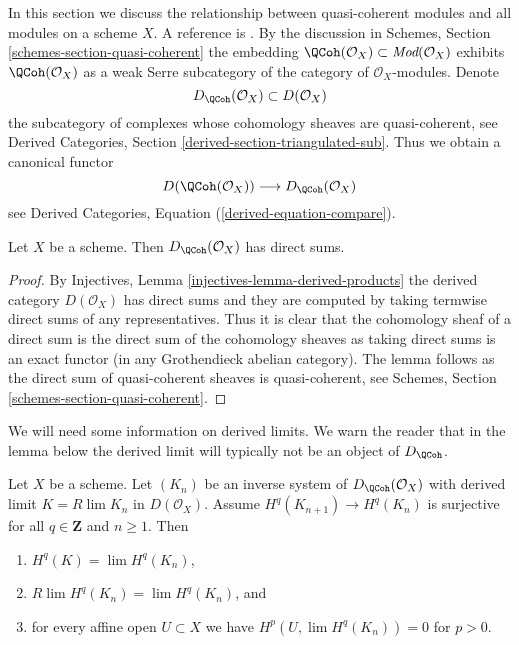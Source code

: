 \noindent
In this section we discuss the relationship between quasi-coherent
modules and all modules on a scheme $X$. A reference is
\cite[Appendix B]{TT}. By the discussion in
Schemes, Section \ref{schemes-section-quasi-coherent}
the embedding
$\QCoh(\mathcal{O}_X) \subset \textit{Mod}(\mathcal{O}_X)$
exhibits $\QCoh(\mathcal{O}_X)$ as a weak Serre subcategory of
the category of $\mathcal{O}_X$-modules. Denote
$$
D_\QCoh(\mathcal{O}_X) \subset D(\mathcal{O}_X)
$$
the subcategory of complexes whose cohomology sheaves are quasi-coherent, see
Derived Categories, Section \ref{derived-section-triangulated-sub}.
Thus we obtain a canonical functor
\begin{equation}
\label{equation-compare}
D(\QCoh(\mathcal{O}_X))
\longrightarrow
D_\QCoh(\mathcal{O}_X)
\end{equation}
see Derived Categories, Equation (\ref{derived-equation-compare}).

\begin{lemma}
\label{lemma-quasi-coherence-direct-sums}
Let $X$ be a scheme. Then $D_\QCoh(\mathcal{O}_X)$
has direct sums.
\end{lemma}

\begin{proof}
By Injectives, Lemma \ref{injectives-lemma-derived-products}
the derived category $D(\mathcal{O}_X)$ has direct sums and
they are computed by taking termwise direct sums of any representatives.
Thus it is clear that the cohomology sheaf of a direct sum is the
direct sum of the cohomology sheaves as taking direct sums is
an exact functor (in any Grothendieck abelian category). The lemma
follows as the direct sum of quasi-coherent sheaves is quasi-coherent, see
Schemes, Section \ref{schemes-section-quasi-coherent}.
\end{proof}

\noindent
We will need some information on derived limits. We warn the reader
that in the lemma below the derived limit will typically not be
an object of $D_\QCoh$.

\begin{lemma}
\label{lemma-Rlim-quasi-coherent}
Let $X$ be a scheme. Let $(K_n)$ be an inverse system of
$D_\QCoh(\mathcal{O}_X)$ with derived limit
$K = R\lim K_n$ in $D(\mathcal{O}_X)$. Assume $H^q(K_{n + 1}) \to H^q(K_n)$
is surjective for all $q \in \mathbf{Z}$ and $n \geq 1$.
Then
\begin{enumerate}
\item $H^q(K) = \lim H^q(K_n)$,
\item $R\lim H^q(K_n) = \lim H^q(K_n)$, and
\item for every affine open $U \subset X$ we have
$H^p(U, \lim H^q(K_n)) = 0$ for $p > 0$.
\end{enumerate}
\end{lemma}

